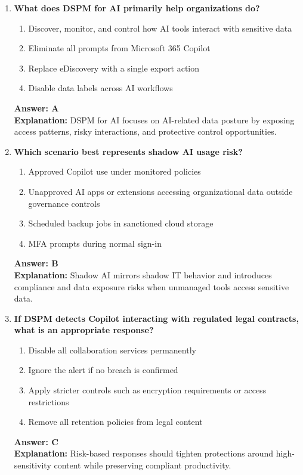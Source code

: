 \documentclass[10pt]{article}
\begin{document}
\begin{enumerate}[leftmargin=*]
\item \textbf{What does DSPM for AI primarily help organizations do?}
\begin{enumerate}[label=\Alph*.]
  \item Discover, monitor, and control how AI tools interact with sensitive data
  \item Eliminate all prompts from Microsoft 365 Copilot
  \item Replace eDiscovery with a single export action
  \item Disable data labels across AI workflows
\end{enumerate}
\textbf{Answer: A}\\
\textbf{Explanation:} DSPM for AI focuses on AI-related data posture by exposing access patterns, risky interactions, and protective control opportunities.

\item \textbf{Which scenario best represents shadow AI usage risk?}
\begin{enumerate}[label=\Alph*.]
  \item Approved Copilot use under monitored policies
  \item Unapproved AI apps or extensions accessing organizational data outside governance controls
  \item Scheduled backup jobs in sanctioned cloud storage
  \item MFA prompts during normal sign-in
\end{enumerate}
\textbf{Answer: B}\\
\textbf{Explanation:} Shadow AI mirrors shadow IT behavior and introduces compliance and data exposure risks when unmanaged tools access sensitive data.

\item \textbf{If DSPM detects Copilot interacting with regulated legal contracts, what is an appropriate response?}
\begin{enumerate}[label=\Alph*.]
  \item Disable all collaboration services permanently
  \item Ignore the alert if no breach is confirmed
  \item Apply stricter controls such as encryption requirements or access restrictions
  \item Remove all retention policies from legal content
\end{enumerate}
\textbf{Answer: C}\\
\textbf{Explanation:} Risk-based responses should tighten protections around high-sensitivity content while preserving compliant productivity.


\end{enumerate}
\end{document}
